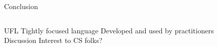 \begin{frame}{Conclusion}
\begin{columns}
\centering
\begin{outline} 
  \1 UFL 
  \2 Tightly focused language
  \2 Developed and used by practitioners
  \1 Discussion
  \2 Interest to CS folks?
\end{outline}

\begin{center}
\centering


\end{center}
\end{columns}
\end{frame}

